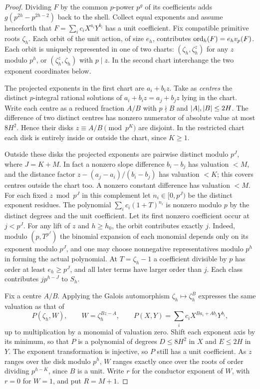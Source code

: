 \begin{proof}
Dividing $F$ by the common $p$-power $p^g$ of its coefficients adds
$g(p^{2h}-p^{2h-2})$ back to the shell. Collect equal exponents and assume
henceforth that $F=\sum_ic_iX^{a_i}Y^{b_i}$ has a unit coefficient. Fix
compatible primitive roots $\zeta_h$. Each orbit of the unit action, of
size $e_h$, contributes $\operatorname{ord}_h(F)=e_hv_p(F)$. Each orbit is uniquely
represented in one of two charts: $(\zeta_h,\zeta_h^z)$ for any $z$ modulo
$p^h$, or $(\zeta_h^z,\zeta_h)$ with $p\mid z$. In the second chart
interchange the two exponent coordinates below.

The projected exponents in the first chart are $a_i+b_iz$. Take as
\emph{centres} the distinct $p$-integral rational solutions of
$a_i+b_iz=a_j+b_jz$ lying in the chart. Write each centre as a reduced
fraction $A/B$ with $p\nmid B$ and $\lvert A\rvert,\lvert B\rvert\le2H$. The difference of
two distinct centres has nonzero numerator of absolute value at most
$8H^2$. Hence their disks $z\equiv A/B\pmod{p^K}$ are disjoint. In the
restricted chart each disk is entirely inside or outside the chart, since
$K\ge1$.

Outside these disks the projected exponents are pairwise distinct modulo
$p^J$, where $J=K+M$. In fact a nonzero slope difference $b_i-b_j$ has
valuation $<M$, and the distance factor $z-(a_j-a_i)/(b_i-b_j)$ has
valuation $<K$; this covers centres outside the chart too. A nonzero
constant difference has valuation $<M$. For each fixed $z\bmod p^J$ in this
complement let $n_i\in[0,p^J)$ be the distinct exponent residues. The
polynomial $\sum_ic_i(1+T)^{n_i}$ is nonzero modulo $p$ by the distinct
degrees and the unit coefficient. Let its first nonzero coefficient occur
at $j<p^J$. For any lift of $z$ and $h\ge h_0$, the orbit contributes
exactly $j$. Indeed, modulo $(p,T^{p^J})$ the binomial expansion of each
monomial depends only on its exponent modulo $p^J$, and one may choose
nonnegative representatives modulo $p^h$ in forming the actual polynomial.
At $T=\zeta_h-1$ a coefficient divisible by $p$ has order at least
$e_h\ge p^J$, and all later terms have larger order than $j$. Each class
contributes $jp^{h-J}$ to $S_h$.

Fix a centre $A/B$. Applying the Galois automorphism
$\zeta_h\mapsto\zeta_h^B$ expresses the same valuation as that of
\[
 P(\zeta_h,W),\qquad W=\zeta_h^{Bz-A},\qquad
 P(X,Y)=\sum_ic_iX^{Ba_i+Ab_i}Y^{b_i},
\]
up to multiplication by a monomial of valuation zero. Shift each exponent
axis by its minimum, so that $P$ is a polynomial of degrees $D\le8H^2$ in
$X$ and $E\le2H$ in $Y$. The exponent transformation is injective, so $P$
still has a unit coefficient. As $z$ ranges over the disk modulo $p^h$,
$W$ ranges exactly once over the roots of order dividing $p^{h-K}$, since
$B$ is a unit. Write $r$ for the conductor exponent of $W$, with $r=0$ for
$W=1$, and put $R=M+1$.


\end{proof}
